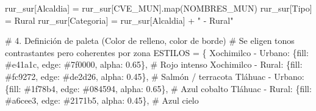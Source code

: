 \documentclass[
  spanish,
  letterpaper,
  DIV=11,
  numbers=noendperiod]{scrartcl}
\newenvironment{Shaded}{\begin{snugshade}}{\end{snugshade}}
\newcommand{\BuiltInTok}[1]{\textcolor[rgb]{0.00,0.23,0.31}{#1}}
\newcommand{\CommentTok}[1]{\textcolor[rgb]{0.37,0.37,0.37}{#1}}
\newcommand{\FloatTok}[1]{\textcolor[rgb]{0.68,0.00,0.00}{#1}}
\newcommand{\NormalTok}[1]{\textcolor[rgb]{0.00,0.23,0.31}{#1}}
\newcommand{\OperatorTok}[1]{\textcolor[rgb]{0.37,0.37,0.37}{#1}}
\newcommand{\StringTok}[1]{\textcolor[rgb]{0.13,0.47,0.30}{#1}}
\begin{document}
\begin{Shaded}
\begin{Highlighting}[]
\NormalTok{rur\_sur[}\StringTok{\textquotesingle{}Alcaldia\textquotesingle{}}\NormalTok{] }\OperatorTok{=}\NormalTok{ rur\_sur[}\StringTok{\textquotesingle{}CVE\_MUN\textquotesingle{}}\NormalTok{].}\BuiltInTok{map}\NormalTok{(NOMBRES\_MUN)}
\NormalTok{rur\_sur[}\StringTok{\textquotesingle{}Tipo\textquotesingle{}}\NormalTok{] }\OperatorTok{=} \StringTok{\textquotesingle{}Rural\textquotesingle{}}
\NormalTok{rur\_sur[}\StringTok{\textquotesingle{}Categoria\textquotesingle{}}\NormalTok{] }\OperatorTok{=}\NormalTok{ rur\_sur[}\StringTok{\textquotesingle{}Alcaldia\textquotesingle{}}\NormalTok{] }\OperatorTok{+} \StringTok{" {-} Rural"}

\CommentTok{\# 4. Definición de paleta (Color de relleno, color de borde)}
\CommentTok{\# Se eligen tonos contrastantes pero coherentes por zona}
\NormalTok{ESTILOS }\OperatorTok{=}\NormalTok{ \{}
    \StringTok{\textquotesingle{}Xochimilco {-} Urbano\textquotesingle{}}\NormalTok{:   \{}\StringTok{\textquotesingle{}fill\textquotesingle{}}\NormalTok{: }\StringTok{\textquotesingle{}\#e41a1c\textquotesingle{}}\NormalTok{, }\StringTok{\textquotesingle{}edge\textquotesingle{}}\NormalTok{: }\StringTok{\textquotesingle{}\#7f0000\textquotesingle{}}\NormalTok{, }\StringTok{\textquotesingle{}alpha\textquotesingle{}}\NormalTok{: }\FloatTok{0.65}\NormalTok{\},  }\CommentTok{\# Rojo intenso}
    \StringTok{\textquotesingle{}Xochimilco {-} Rural\textquotesingle{}}\NormalTok{:    \{}\StringTok{\textquotesingle{}fill\textquotesingle{}}\NormalTok{: }\StringTok{\textquotesingle{}\#fc9272\textquotesingle{}}\NormalTok{, }\StringTok{\textquotesingle{}edge\textquotesingle{}}\NormalTok{: }\StringTok{\textquotesingle{}\#de2d26\textquotesingle{}}\NormalTok{, }\StringTok{\textquotesingle{}alpha\textquotesingle{}}\NormalTok{: }\FloatTok{0.45}\NormalTok{\},  }\CommentTok{\# Salmón / terracota}
    \StringTok{\textquotesingle{}Tláhuac {-} Urbano\textquotesingle{}}\NormalTok{:       \{}\StringTok{\textquotesingle{}fill\textquotesingle{}}\NormalTok{: }\StringTok{\textquotesingle{}\#1f78b4\textquotesingle{}}\NormalTok{, }\StringTok{\textquotesingle{}edge\textquotesingle{}}\NormalTok{: }\StringTok{\textquotesingle{}\#084594\textquotesingle{}}\NormalTok{, }\StringTok{\textquotesingle{}alpha\textquotesingle{}}\NormalTok{: }\FloatTok{0.65}\NormalTok{\},  }\CommentTok{\# Azul cobalto}
    \StringTok{\textquotesingle{}Tláhuac {-} Rural\textquotesingle{}}\NormalTok{:        \{}\StringTok{\textquotesingle{}fill\textquotesingle{}}\NormalTok{: }\StringTok{\textquotesingle{}\#a6cee3\textquotesingle{}}\NormalTok{, }\StringTok{\textquotesingle{}edge\textquotesingle{}}\NormalTok{: }\StringTok{\textquotesingle{}\#2171b5\textquotesingle{}}\NormalTok{, }\StringTok{\textquotesingle{}alpha\textquotesingle{}}\NormalTok{: }\FloatTok{0.45}\NormalTok{\},  }\CommentTok{\# Azul cielo}

\end{Highlighting}
\end{Shaded}
\end{document}
